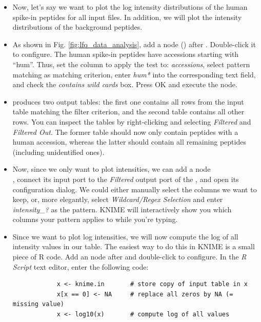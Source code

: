 \begin{itemize}
    \item Now, let's say we want to plot the log intensity distributions of the human spike-in peptides for all input files. In addition, we will plot the intensity distributions of the background peptides.
    \item As shown in Fig. \ref{fig:lfq_data_analysis}, add a  node () after . Double-click it to configure. The human spike-in peptides have accessions starting with ``hum''. Thus, set the column to apply the test to: \textit{accessions}, select pattern matching as matching criterion, enter \textit{hum*} into the corresponding text field, and check the \textit{contains wild cards} box. Press OK and execute the node.
    \item {} produces two output tables: the first one contains all rows from the input table matching the filter criterion, and the second table contains all other rows. You can inspect the tables by right-clicking and selecting \textit{Filtered} and \textit{Filtered Out}. The former table should now only contain peptides with a human accession, whereas the latter should contain all remaining peptides (including unidentified ones).
    \item Now, since we only want to plot intensities, we can add a  node \\ , connect its input port to the \textit{Filtered} output port of the , and open its configuration dialog. We could either manually select the columns we want to keep, or, more elegantly, select \textit{Wildcard/Regex Selection} and enter \textit{intensity\_?} as the pattern. KNIME will interactively show you which columns your pattern applies to while you're typing.
    \item Since we want to plot log intensities, we will now compute the log of all intensity values in our table. The easiest way to do this in KNIME is a small piece of R code. Add an  node  after  and double-click to configure. In the \textit{R Script} text editor, enter the following code:
        \begin{lstlisting}
            x <- knime.in       # store copy of input table in x
            x[x == 0] <- NA     # replace all zeros by NA (= missing value)
            x <- log10(x)       # compute log of all values

\end{lstlisting}
\end{itemize}
